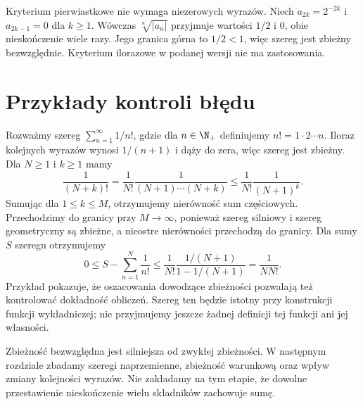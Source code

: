 \begin{przyklad}
Kryterium pierwiastkowe nie wymaga niezerowych wyrazów. Niech $a_{2k}=2^{-2k}$ i $a_{2k-1}=0$ dla $k\ge1$. Wówczas $\sqrt[n]{|a_n|}$ przyjmuje wartości $1/2$ i $0$, obie nieskończenie wiele razy. Jego granica górna to $1/2<1$, więc szereg jest zbieżny bezwzględnie. Kryterium ilorazowe w podanej wersji nie ma zastosowania.
\end{przyklad}

\section{Przykłady kontroli błędu}
\begin{przyklad}
\label{ma1:ex:factorial-series}
Rozważmy szereg $\sum_{n=1}^\infty 1/n!$, gdzie dla $n\in\N_+$ definiujemy $n!=1\cdot2\cdots n$. Iloraz kolejnych wyrazów wynosi $1/(n+1)$ i dąży do zera, więc szereg jest zbieżny. Dla $N\ge1$ i $k\ge1$ mamy
\[
 \frac1{(N+k)!}=\frac1{N!}\frac1{(N+1)\cdots(N+k)}
 \le\frac1{N!}\frac1{(N+1)^k}.
\]
Sumując dla $1\le k\le M$, otrzymujemy nierówność sum częściowych. Przechodzimy do granicy przy $M\to\infty$, ponieważ szereg silniowy i szereg geometryczny są zbieżne, a nieostre nierówności przechodzą do granicy. Dla sumy $S$ szeregu otrzymujemy
\[
 0\le S-\sum_{n=1}^N\frac1{n!}\le
 \frac1{N!}\frac{1/(N+1)}{1-1/(N+1)}
 =\frac1{NN!}.
\]
Przykład pokazuje, że oszacowania dowodzące zbieżności pozwalają też kontrolować dokładność obliczeń. Szereg ten będzie istotny przy konstrukcji funkcji wykładniczej; nie przyjmujemy jeszcze żadnej definicji tej funkcji ani jej własności.
\end{przyklad}
\begin{uwaga}
Zbieżność bezwzględna jest silniejsza od zwykłej zbieżności. W następnym rozdziale zbadamy szeregi naprzemienne, zbieżność warunkową oraz wpływ zmiany kolejności wyrazów. Nie zakładamy na tym etapie, że dowolne przestawienie nieskończenie wielu składników zachowuje sumę.
\end{uwaga}
